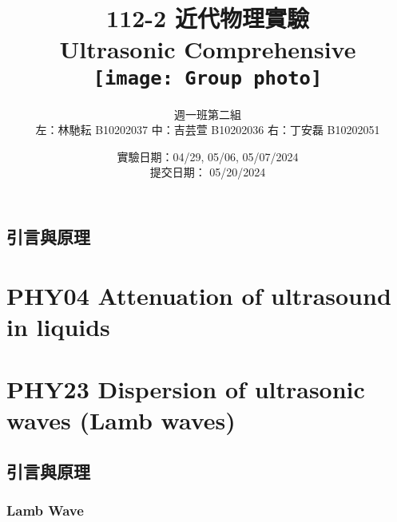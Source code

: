 \documentclass[10pt]{report}
\title{112-2 近代物理實驗\\Ultrasonic Comprehensive\\\vspace{1cm}
\texttt{[image: Group photo]}
}
\author{週一班第二組 \\ 左：林馳耘 B10202037 中：吉芸萱 B10202036 右：丁安磊 B10202051}
\date{實驗日期：04/29, 05/06, 05/07/2024\\提交日期： 05/20/2024}
\begin{document}
\renewcommand{\figurename}{圖}
\renewcommand{\tablename}{表}
\newcommand{\br}[1]{\left(#1\right)}
\renewcommand{\vb}[1]{\boldsymbol{\mathbf{#1}}} %

\maketitle

\tableofcontents

\clearpage

\section{引言與原理}

\chapter{PHY04 Attenuation of ultrasound in liquids}

\chapter{PHY23 Dispersion of ultrasonic waves (Lamb waves)}

\section{引言與原理}

\subsection{Lamb Wave}
\end{document}
